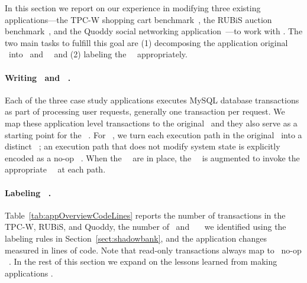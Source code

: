 In this section we report on our experience in modifying three
existing applications---the TPC-W shopping cart
benchmark~\cite{TPC-Wv18}, the RUBiS auction benchmark~\cite{RUBiS},
and the Quoddy social networking application~\cite{Quoddy}---to work with
\RBc. The two main tasks to fulfill this goal are (1) decomposing
the application original \operations\ into \initial\ and \shadow\ \operations\ and (2)
labeling the \shadow\ \operations\ appropriately.

\paragraph{Writing \initial\ and \shadow\ \operations.} 
Each of the three case study applications executes MySQL data\-base
transactions as part of processing user requests, generally one
transaction per request. We map these application level transactions
to the original \operations\ and they also serve as a starting point
for the \initial\ \operations. For \shadow\ \operations, we turn each execution path in
  the original \operation\ into a distinct \shadow\ \operation; an
  execution path that does not modify system state is explicitly
  encoded as a no-op \shadow\ \operation. When the \shadow\ \operations\ are in place, the
 \initial\ \operation\ is augmented to invoke the appropriate
 \shadow\ \operation\ at each path.

\paragraph{Labeling \shadow\ \operations.}  
Table~\ref{tab:appOverviewCodeLines} reports the number of
transactions in the TPC-W, RUBiS, and Quoddy, the number of \blue\ and
\red\ \shadow\ \transactions\ we identified using the
  labeling rules in Section~\ref{sect:shadowbank}, and the application
changes measured in lines of code. Note that read-only transactions
always map to \blue\ no-op \shadow\ \operations.  In the rest of
this section we expand on the lessons learned from making applications \RBct.



